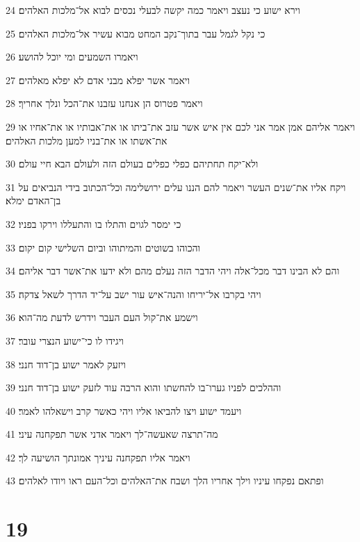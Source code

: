 \par 24 וירא ישוע כי נעצב ויאמר כמה יקשה לבעלי נכסים לבוא אל־מלכות האלהים׃
\par 25 כי נקל לגמל עבר בתוך־נקב המחט מבוא עשיר אל־מלכות האלהים׃
\par 26 ויאמרו השמעים ומי יוכל להושע׃
\par 27 ויאמר אשר יפלא מבני אדם לא יפלא מאלהים׃
\par 28 ויאמר פטרוס הן אנחנו עזבנו את־הכל ונלך אחריך׃
\par 29 ויאמר אליהם אמן אמר אני לכם אין איש אשר עזב את־ביתו או את־אבותיו או את־אחיו או את־אשתו או את־בניו למען מלכות האלהים׃
\par 30 ולא־יקח תחתיהם כפלי כפלים בעולם הזה ולעולם הבא חיי עולם׃
\par 31 ויקח אליו את־שנים העשר ויאמר להם הננו עלים ירושלימה וכל־הכתוב בידי הנביאים על בן־האדם ימלא׃
\par 32 כי ימסר לגוים והתלו בו והתעללו וירקו בפניו׃
\par 33 והכוהו בשוטים והמיתוהו וביום השלישי קום יקום׃
\par 34 והם לא הבינו דבר מכל־אלה ויהי הדבר הזה נעלם מהם ולא ידעו את־אשר דבר אליהם׃
\par 35 ויהי בקרבו אל־יריחו והנה־איש עור ישב על־יד הדרך לשאל צדקה׃
\par 36 וישמע את־קול העם העבר וידרש לדעת מה־הוא׃
\par 37 ויגידו לו כי־ישוע הנצרי עובר׃
\par 38 ויזעק לאמר ישוע בן־דוד חנני׃
\par 39 וההלכים לפניו גערו־בו להחשתו והוא הרבה עוד לזעק ישוע בן־דוד חנני׃
\par 40 ויעמד ישוע ויצו להביאו אליו ויהי כאשר קרב וישאלהו לאמר׃
\par 41 מה־תרצה שאעשה־לך ויאמר אדני אשר תפקחנה עיני׃
\par 42 ויאמר אליו תפקחנה עיניך אמונתך הושיעה לך׃
\par 43 ופתאם נפקחו עיניו וילך אחריו הלך ושבח את־האלהים וכל־העם ראו ויודו לאלהים׃

\chapter{19}

